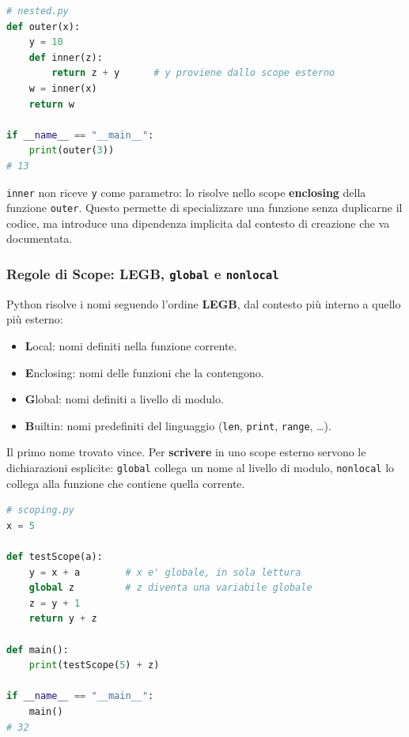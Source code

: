 \documentclass[12pt]{extarticle}
\begin{document}
\begin{lstlisting}[language=Python]
# nested.py
def outer(x):
    y = 10
    def inner(z):
        return z + y      # y proviene dallo scope esterno
    w = inner(x)
    return w

if __name__ == "__main__":
    print(outer(3))
# 13
\end{lstlisting}

\noindent \texttt{inner} non riceve \texttt{y} come parametro: lo risolve nello scope \textbf{enclosing} della funzione \texttt{outer}. Questo permette di specializzare una funzione senza duplicarne il codice, ma introduce una dipendenza implicita dal contesto di creazione che va documentata.

\subsubsection{Regole di Scope: LEGB, \texttt{global} e \texttt{nonlocal}}

\noindent Python risolve i nomi seguendo l'ordine \textbf{LEGB}, dal contesto più interno a quello più esterno:

\begin{itemize}
    \item \textbf{L}ocal: nomi definiti nella funzione corrente.
    \item \textbf{E}nclosing: nomi delle funzioni che la contengono.
    \item \textbf{G}lobal: nomi definiti a livello di modulo.
    \item \textbf{B}uiltin: nomi predefiniti del linguaggio (\texttt{len}, \texttt{print}, \texttt{range}, \dots).
\end{itemize}

\noindent Il primo nome trovato vince. Per \textbf{scrivere} in uno scope esterno servono le dichiarazioni esplicite: \texttt{global} collega un nome al livello di modulo, \texttt{nonlocal} lo collega alla funzione che contiene quella corrente.

\begin{lstlisting}[language=Python]
# scoping.py
x = 5

def testScope(a):
    y = x + a        # x e' globale, in sola lettura
    global z         # z diventa una variabile globale
    z = y + 1
    return y + z

def main():
    print(testScope(5) + z)

if __name__ == "__main__":
    main()
# 32
\end{lstlisting}
\end{document}
